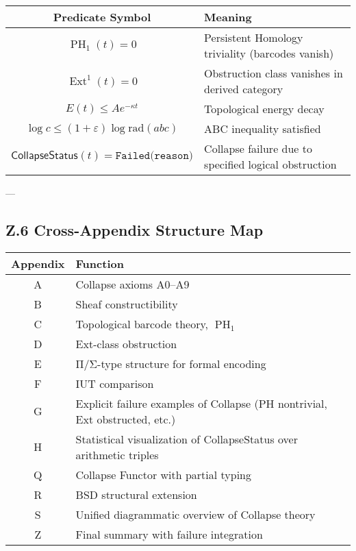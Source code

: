 \documentclass[11pt]{article}
\DeclareMathOperator{\Ext}{Ext}
\DeclareMathOperator{\PH}{PH}
\begin{document}
\begin{center}
\begin{tabular}{|c|p{10cm}|}
\hline
\textbf{Predicate Symbol} & \textbf{Meaning} \\
\hline
\( \PH_1(t) = 0 \) & Persistent Homology triviality (barcodes vanish) \\
\hline
\( \Ext^1(t) = 0 \) & Obstruction class vanishes in derived category \\
\hline
\( E(t) \leq Ae^{-\kappa t} \) & Topological energy decay \\
\hline
\( \log c \leq (1+\varepsilon)\log \mathrm{rad}(abc) \) & ABC inequality satisfied \\
\hline
\( \mathsf{CollapseStatus}(t) = \texttt{Failed(reason)} \) & Collapse failure due to specified logical obstruction \\
\hline
\end{tabular}
\end{center}


---

\subsection*{Z.6 Cross-Appendix Structure Map}

\begin{center}
\begin{tabular}{|c|p{10cm}|}
\hline
\textbf{Appendix} & \textbf{Function} \\
\hline
A & Collapse axioms A0–A9 \\
\hline
B & Sheaf constructibility \\
\hline
C & Topological barcode theory, \( \PH_1 \) \\
\hline
D & Ext-class obstruction \\
\hline
E & Π/Σ-type structure for formal encoding \\
\hline
F & IUT comparison \\
\hline
G & Explicit failure examples of Collapse (PH nontrivial, Ext obstructed, etc.) \\
\hline
H & Statistical visualization of CollapseStatus over arithmetic triples \\
\hline
Q & Collapse Functor with partial typing \\
\hline
R & BSD structural extension \\
\hline
S & Unified diagrammatic overview of Collapse theory \\
\hline
Z & Final summary with failure integration \\
\hline
\end{tabular}
\end{center}
\end{document}
